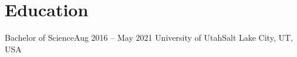 \section{Education}
\mySubHeadingListStart

  \mySubHeading
    {Bachelor of Science}{Aug 2016 -- May 2021}
    {University of Utah}{Salt Lake City, UT, USA}
    \myItemListStart
    \myItemListEnd

\mySubHeadingListEnd
